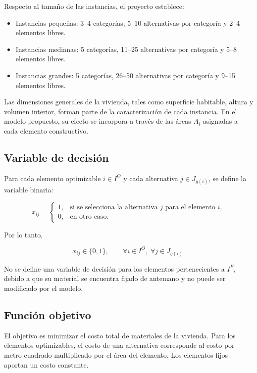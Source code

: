 Respecto al tamaño de las instancias, el proyecto establece:

\begin{itemize}
    \item Instancias pequeñas: 3--4 categorías, 5--10 alternativas por
    categoría y 2--4 elementos libres.
    \item Instancias medianas: 5 categorías, 11--25 alternativas por
    categoría y 5--8 elementos libres.
    \item Instancias grandes: 5 categorías, 26--50 alternativas por
    categoría y 9--15 elementos libres.
\end{itemize}

Las dimensiones generales de la vivienda, tales como superficie habitable,
altura y volumen interior, forman parte de la caracterización de cada
instancia. En el modelo propuesto, su efecto se incorpora a través de las
áreas $A_i$ asignadas a cada elemento constructivo.

\subsection{Variable de decisión}

Para cada elemento optimizable $i \in I^{O}$ y cada alternativa
$j \in J_{g(i)}$, se define la variable binaria:

\[
x_{ij}=
\begin{cases}
1, & \text{si se selecciona la alternativa } j \text{ para el elemento } i,\\
0, & \text{en otro caso.}
\end{cases}
\]

Por lo tanto,

\[
x_{ij}\in\{0,1\},
\qquad
\forall i\in I^{O},\;
\forall j\in J_{g(i)}.
\]

No se define una variable de decisión para los elementos pertenecientes a
$I^{F}$, debido a que su material se encuentra fijado de antemano y no puede
ser modificado por el modelo.

\subsection{Función objetivo}

El objetivo es minimizar el costo total de materiales de la vivienda. Para los
elementos optimizables, el costo de una alternativa corresponde al costo por
metro cuadrado multiplicado por el área del elemento. Los elementos fijos
aportan un costo constante.


